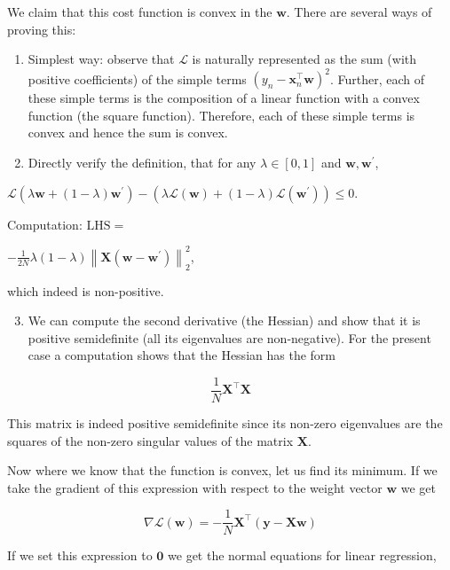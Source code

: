 \documentclass[10pt]{article}
\begin{document}
We claim that this cost function is convex in the $\mathbf{w}$. There are several ways of proving this:

\begin{enumerate}
  \item Simplest way: observe that $\mathcal{L}$ is naturally represented as the sum (with positive coefficients) of the simple terms $\left(y_{n}-\mathbf{x}_{n}^{\top} \mathbf{w}\right)^{2}$. Further, each of these simple terms is the composition of a linear function with a convex function (the square function). Therefore, each of these simple terms is convex and hence the sum is convex.

  \item Directly verify the definition, that for any $\lambda \in[0,1]$ and $\mathbf{w}, \mathbf{w}^{\prime}$,

\end{enumerate}

$\mathcal{L}\left(\lambda \mathbf{w}+(1-\lambda) \mathbf{w}^{\prime}\right)-\left(\lambda \mathcal{L}(\mathbf{w})+(1-\lambda) \mathcal{L}\left(\mathbf{w}^{\prime}\right)\right) \leq 0$.

Computation: $\mathrm{LHS}=$

$-\frac{1}{2 N} \lambda(1-\lambda)\left\|\mathbf{X}\left(\mathbf{w}-\mathbf{w}^{\prime}\right)\right\|_{2}^{2}$,

which indeed is non-positive.

\begin{enumerate}
  \setcounter{enumi}{2}
  \item We can compute the second derivative (the Hessian) and show that it is positive semidefinite (all its eigenvalues are non-negative). For the present case a computation shows that the Hessian has the form
\end{enumerate}

$$
\frac{1}{N} \mathbf{X}^{\top} \mathbf{X}
$$

This matrix is indeed positive semidefinite since its non-zero eigenvalues are the squares of the non-zero singular values of the matrix $\mathbf{X}$.

Now where we know that the function is convex, let us find its minimum. If we take the gradient of this expression with respect to the weight vector $\mathbf{w}$ we get

$$
\nabla \mathcal{L}(\mathbf{w})=-\frac{1}{N} \mathbf{X}^{\top}(\mathbf{y}-\mathbf{X} \mathbf{w})
$$

If we set this expression to $\mathbf{0}$ we get the normal equations for linear regression,
\end{document}

